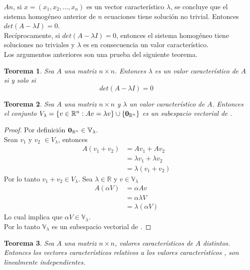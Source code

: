 \documentclass[10pt,a4paper]{report}
\newtheorem{theorem}{Teorema}[chapter]
\theoremstyle{definition}
\theoremstyle{remark}
\numberwithin{section}{chapter}
\numberwithin{equation}{chapter}
\numberwithin{tacounter}{chapter}
\begin{document}
\noindent $An$, si $x = (x_1 , x_2 , \ldots , x_n)$ es un vector característico $\lambda$, se concluye que el sistema homogéneo anterior de $n$ ecuaciones tiene solución no trivial. Entonces $det (A - \lambda I) = 0$.\\
Recíprocamente, si $det(A- \lambda I)=0$, entonces el sistema homogéneo tiene soluciones no triviales y $\lambda$ es en consecuencia un valor característico.\\
Los argumentos anteriores son una prueba del siguiente teorema.
\begin{theorem}
Sea $A$ una matriz $n \times n$. Entonces $\lambda$ es un valor característico de $A$ si y solo si 
$$det(A- \lambda I) =0$$
\end{theorem}

\begin{theorem}
Sea $A$ una matriz $n \times n$ y $\lambda$ un valor característico de $A$. Entonces el conjunto $V_{\lambda} = \{v \in \mathbb{R}^n : Av = \lambda v \} \cup  \{\mathbf{0}_{\mathbb{R}^n}\}$ es un subespacio vectorial de \rn .
\end{theorem}

\begin{proof}
Por definición $\mathbf{0}_{\mathbb{R}^n} \in \mathbb{V}_{\lambda}$.\\
Sean $v_1$ y $v_2$ $\in V_{\lambda}$, entonces 
\begin{align*}
A(v_1 + v_2) &= A v_1 + A v_2\\
&= \lambda v_1 + \lambda v_2\\
&= \lambda (v_1 + v_2)
\end{align*}
Por lo tanto $v_1 + v_2 \in V_{\lambda}$.
Sea $\lambda \in \mathbb{R}$ y $v \in \mathbb{V}_{\lambda}$
\begin{align*}
A(\alpha V) &= \alpha A v\\
&= \alpha \lambda V\\
&=\lambda (\alpha V)
\end{align*}
Lo cual implica que $\alpha V \in \mathbb{V}_{\lambda}$.\\
Por lo tanto $\mathbb{V}_{\lambda}$ es un subespacio vectorial de \rn .
\end{proof}

\begin{theorem}
Sea $A$ una matriz $n \times n$,  valores característicos de $A$ distintos. Entonces los vectores característicos  relativos a los valores característícos , son linealmente independientes.
\end{theorem}
\end{document}
